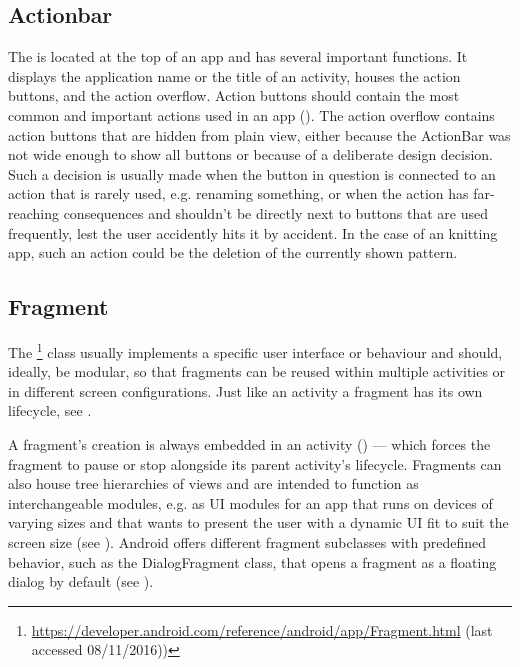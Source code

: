 \subsection{Actionbar}
The  is located at the top of an app and has several important functions. It displays the application name or the title of an activity, houses the action buttons, and the action overflow. Action buttons should contain the most common and important actions used in an app (\cite{actionbar}). The action overflow contains action buttons that are hidden from plain view, either because the ActionBar was not wide enough to show all buttons or because of a deliberate design decision. Such a decision is usually made when the button in question is connected to an action that is rarely used, e.g. renaming something, or when the action has far-reaching consequences and shouldn't be directly next to buttons that are used frequently, lest the user accidently hits it by accident. In the case of an knitting app, such an action could be the deletion of the currently shown pattern. 

\subsection{Fragment}
\label{impl:fragment}
The \footnote{\url{https://developer.android.com/reference/android/app/Fragment.html} (last accessed 08/11/2016))} class usually implements a specific user interface or behaviour and should, ideally, be modular, so that fragments can be reused within multiple activities or in different screen configurations. Just like an activity a fragment has its own lifecycle, see .

A fragment's creation is always embedded in an activity (\cite{androidfragment}) --- which forces the fragment to pause or stop alongside its parent activity's lifecycle. Fragments can also house tree hierarchies of views and are intended to function as interchangeable modules, e.g. as \gls{UI} modules for an app that runs on devices of varying sizes and that wants to present the user with a dynamic \gls{UI} fit to suit the screen size (see ). Android offers different fragment subclasses with predefined behavior, such as the DialogFragment class, that opens a fragment as a floating dialog by default (see ).

